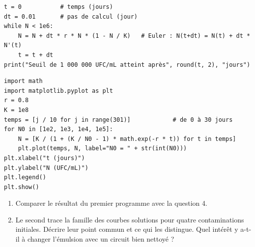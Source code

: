 \documentclass[a4paper,11pt]{article}
\newcommand{\rep}[1]{\par\noindent\begin{minipage}[t][#1cm]{\linewidth}\mbox{}\end{minipage}\par}
\begin{document}
\begin{enumerate}
\begin{lstlisting}[style=uimmpython]
t = 0           # temps (jours)
dt = 0.01       # pas de calcul (jour)
while N < 1e6:
    N = N + dt * r * N * (1 - N / K)   # Euler : N(t+dt) = N(t) + dt * N'(t)
    t = t + dt
print("Seuil de 1 000 000 UFC/mL atteint après", round(t, 2), "jours")
\end{lstlisting}
\needspace{6.5cm}
\begin{lstlisting}[style=uimmpython]
import math
import matplotlib.pyplot as plt
r = 0.8
K = 1e8
temps = [j / 10 for j in range(301)]            # de 0 à 30 jours
for N0 in [1e2, 1e3, 1e4, 1e5]:
    N = [K / (1 + (K / N0 - 1) * math.exp(-r * t)) for t in temps]
    plt.plot(temps, N, label="N0 = " + str(int(N0)))
plt.xlabel("t (jours)")
plt.ylabel("N (UFC/mL)")
plt.legend()
plt.show()
\end{lstlisting}
  \begin{enumerate}
    \item Comparer le résultat du premier programme avec la question 4.
    \item Le second trace la famille des courbes solutions pour quatre contaminations initiales. Décrire leur point commun et ce qui les distingue. Quel intérêt y a-t-il à changer l'émulsion avec un circuit bien nettoyé ?
  \end{enumerate}
  \rep{3.5}
\end{enumerate}
\end{document}
